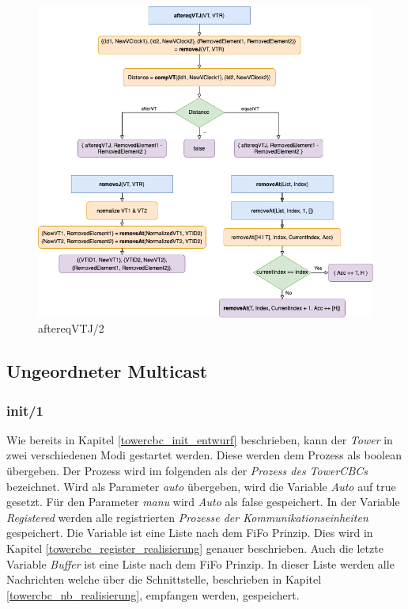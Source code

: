 \begin{figure}[htbp]
\begin{center}
\includegraphics[scale=0.55]{Latex/Bilder/aftereqVTJ_realisierung.png}
\caption{\label{fig:flow_aftereqvtj_realisierung} aftereqVTJ/2}
\end{center}
\end{figure}

\subsection{Ungeordneter Multicast}

\subsubsection{init/1}

Wie bereits in Kapitel \ref{towercbc_init_entwurf} beschrieben, kann der \textit{Tower} in zwei verschiedenen Modi gestartet werden. Diese werden dem Prozess als boolean übergeben. Der Prozess wird im folgenden als der \textit{Prozess des TowerCBCs} bezeichnet. Wird als Parameter \textit{auto} übergeben, wird die Variable \textit{Auto} auf true gesetzt. Für den Parameter \textit{manu} wird \textit{Auto} als false gespeichert. In der Variable \textit{Registered} werden alle registrierten \textit{Prozesse der Kommunikationseinheiten} gespeichert. Die Variable ist eine Liste nach dem FiFo Prinzip. Dies wird in Kapitel \ref{towercbc_register_realisierung} genauer beschrieben. Auch die letzte Variable \textit{Buffer} ist eine Liste nach dem FiFo Prinzip. In dieser Liste werden alle Nachrichten welche über die Schnittstelle, beschrieben in Kapitel \ref{towercbc_nb_realisierung}, empfangen werden, gespeichert.

